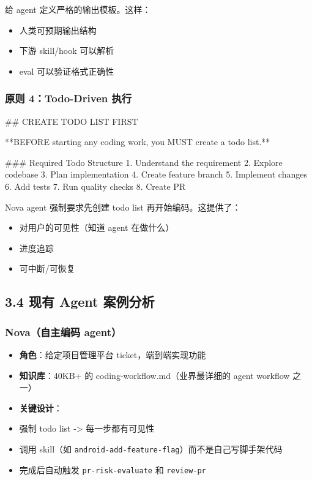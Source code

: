 给 agent 定义严格的输出模板。这样：

\begin{itemize}[leftmargin=2em]
\item 人类可预期输出结构
\item 下游 skill/hook 可以解析
\item eval 可以验证格式正确性
\end{itemize}

\subsubsection{原则 4：Todo-Driven 执行}

\begin{codeblock}
## CREATE TODO LIST FIRST

**BEFORE starting any coding work, you MUST create a todo list.**

### Required Todo Structure
1. Understand the requirement
2. Explore codebase
3. Plan implementation
4. Create feature branch
5. Implement changes
6. Add tests
7. Run quality checks
8. Create PR
\end{codeblock}

Nova agent 强制要求先创建 todo list 再开始编码。这提供了：

\begin{itemize}[leftmargin=2em]
\item 对用户的可见性（知道 agent 在做什么）
\item 进度追踪
\item 可中断/可恢复
\end{itemize}

\subsection{3.4 现有 Agent 案例分析}

\subsubsection{Nova（自主编码 agent）}

\begin{itemize}[leftmargin=2em]
\item \textbf{角色}：给定项目管理平台 ticket，端到端实现功能
\item \textbf{知识库}：40KB+ 的 coding-workflow.md（业界最详细的 agent workflow 之一）
\item \textbf{关键设计}：
\item 强制 todo list -> 每一步都有可见性
\item 调用 skill（如 \texttt{android-add-feature-flag}）而不是自己写脚手架代码
\item 完成后自动触发 \texttt{pr-risk-evaluate} 和 \texttt{review-pr}
\end{itemize}

